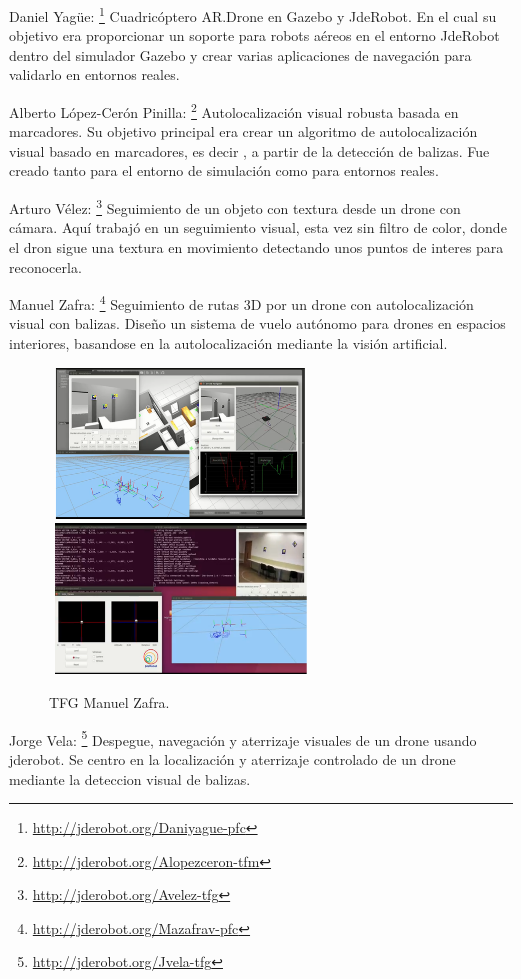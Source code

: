 \hspace{1cm} Daniel Yagüe: \footnote{\url{http://jderobot.org/Daniyague-pfc}} Cuadricóptero AR.Drone en Gazebo y JdeRobot. En el cual su objetivo era proporcionar un soporte para robots aéreos en el entorno JdeRobot dentro del simulador Gazebo y crear varias aplicaciones de navegación para validarlo en entornos reales.

\hspace{1cm} Alberto López-Cerón Pinilla: \footnote{\url{http://jderobot.org/Alopezceron-tfm}} Autolocalización visual robusta basada en marcadores. Su objetivo principal era crear un algoritmo de autolocalización visual basado en marcadores, es decir , a partir de la detección de balizas. Fue creado tanto para el entorno de simulación como para entornos reales.

\hspace{1cm} Arturo Vélez: \footnote{\url{http://jderobot.org/Avelez-tfg}} Seguimiento de un objeto con textura desde un drone con
cámara. Aquí trabajó en un seguimiento visual, esta vez sin filtro de color, donde el dron sigue una textura en movimiento detectando unos puntos de interes para reconocerla.

\hspace{1cm} Manuel Zafra: \footnote{\url{http://jderobot.org/Mazafrav-pfc}} Seguimiento de rutas 3D por un drone con autolocalización
visual con balizas. Diseño un sistema de vuelo autónomo para drones en espacios interiores, basandose en la autolocalización mediante la visión artificial.

\begin{figure}[H]
 \centering
    \includegraphics[width=7cm,height=4cm]{imag/IMG9.png}
    \includegraphics[width=7cm,height=4cm]{imag/IMG10.png}
 \caption{TFG Manuel Zafra.}
 \label{f:TFG Manuel Zafra}
\end{figure} 

\hspace{1cm} Jorge Vela: \footnote{\url{http://jderobot.org/Jvela-tfg}} Despegue, navegación y aterrizaje visuales de un drone usando jderobot. Se centro en la localización y aterrizaje controlado de un drone mediante la deteccion visual de balizas. 

